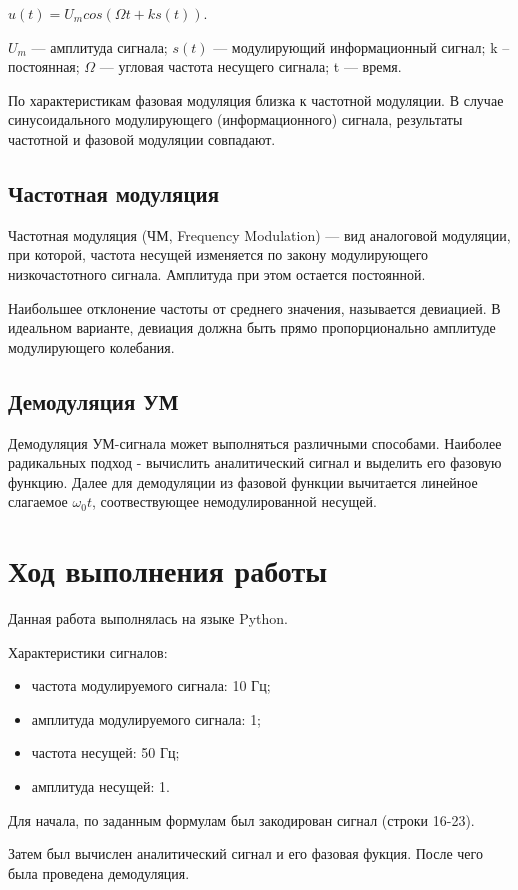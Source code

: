 $ u(t) = U_m cos(\Omega t + k s(t)) $.

$ U_m $ — амплитуда сигнала; $ s(t) $ — модулирующий информационный сигнал; k – постоянная; $ \Omega $ — угловая частота несущего сигнала; t — время.

По характеристикам фазовая модуляция близка к частотной модуляции. В случае синусоидального модулирующего (информационного) сигнала, результаты частотной и фазовой модуляции совпадают.

\subsection{Частотная модуляция}
Частотная модуляция (ЧМ, Frequency Modulation) — вид аналоговой модуляции, при которой, частота несущей изменяется по закону модулирующего низкочастотного сигнала. Амплитуда при этом остается постоянной.

Наибольшее отклонение частоты от среднего значения, называется девиацией.
В идеальном варианте, девиация должна быть прямо пропорционально амплитуде модулирующего колебания.

\subsection{Демодуляция УМ}
Демодуляция УМ-сигнала может выполняться различными способами. Наиболее радикальных подход - вычислить аналитический сигнал и выделить его фазовую функцию. Далее для демодуляции из фазовой функции вычитается линейное слагаемое $ \omega_0 t $, соотвествующее немодулированной несущей.

\section{Ход выполнения работы}
Данная работа выполнялась на языке Python.

Характеристики сигналов:
\begin{itemize}
	\item частота модулируемого сигнала: 10 Гц;
	\item амплитуда модулируемого сигнала: 1;
	\item частота несущей: 50 Гц;
	\item амплитуда несущей: 1.
\end{itemize}

Для начала, по заданным формулам был закодирован сигнал (строки 16-23).

Затем был вычислен аналитический сигнал и его фазовая фукция. После чего была проведена демодуляция.

